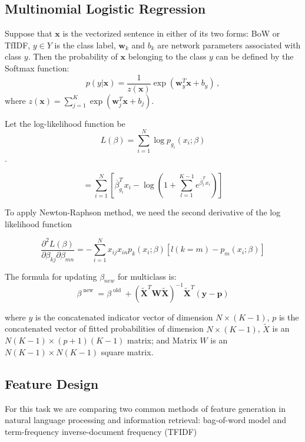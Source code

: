 \subsection{Multinomial Logistic Regression}
Suppose that $\mathbf{x}$ is the vectorized sentence in either of its two forms: BoW or TfIDF, $y\in Y$ is the class label, $\mathbf{w}_k$ and $b_k$ are network parameters associated with class $y$. Then the probability of $\mathbf{x}$ belonging to the class $y$ can be defined by the Softmax function:
\begin{equation}
p(y|\mathbf{x}) =\frac{1}{z(\mathbf{x})}\exp(\mathbf{w}_y^T\mathbf{x}+b_y) \,,
\label{eq:softmax}
\end{equation}
where $z(\mathbf{x}) = \sum_{j=1}^{K}\exp(\mathbf{w}_j^T\mathbf{x}+b_j)$.

Let the log-likelihood function be $$L ( \beta ) = \sum _ { i = 1 } ^ { N } \log p _ { g _ { i } } \left( x _ { i } ; \beta \right)$$. 

$$= \sum _ { i = 1 } ^ { N } \left[ \overline { \beta } _ { g _ { i } } ^ { T } x _ { i } - \log \left( 1 + \sum _ { l = 1 } ^ { K - 1 } e ^ { \overline { \beta } _ { l } ^ { T } x _ { i } } \right) \right]$$

To apply Newton-Raphson method, we need the second derivative of the log likelihood function

$$\frac { \partial ^ { 2 } L ( \beta ) } { \partial \beta _ { k j } \partial \beta _ { m n } } = - \sum _ { i = 1 } ^ { N } x _ { i j } x _ { i n } p _ { k } \left( x _ { i } ; \beta \right) \left[ l ( k = m ) - p _ { m } \left( x _ { i } ; \beta \right) \right]$$

The formula for updating $\beta_{new}$ for multiclass is:
$$\beta ^ { \text { new } } = \beta ^ { \text { old } } + \left( \tilde { \mathbf { X } } ^ { T } \mathbf { W } \tilde { \mathbf { X } } \right) ^ { - 1 } \tilde { \mathbf { X } } ^ { T } ( \mathbf { y } - \mathbf { p } )$$

where $y$ is the concatenated indicator vector of dimension $N \times (K-1)$, $p$ is the concatenated vector of fitted probabilities of dimension $N \times (K-1)$, $\tilde{X}$ is an $N(K-1)\times (p+1)(K-1)$ matrix; and Matrix $W$ is an $N(K-1)\times N(K-1)$ square matrix.

\subsection{Feature Design}

For this task we are comparing two common methods of feature generation in natural language processing and information retrieval: bag-of-word model and term-frequency inverse-document frequency (TFIDF)

